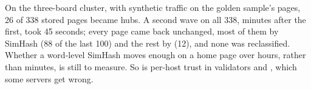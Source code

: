 On the three-board cluster, with synthetic traffic on the golden sample's pages, 26 of 338 stored pages became hubs. A second wave on all 338, minutes after the first, took 45 seconds; every page came back unchanged, most of them by SimHash (88 of the last 100) and the rest by  (12), and none was reclassified. Whether a word-level SimHash moves enough on a home page over hours, rather than minutes, is still to measure. So is per-host trust in validators and , which some servers get wrong.
